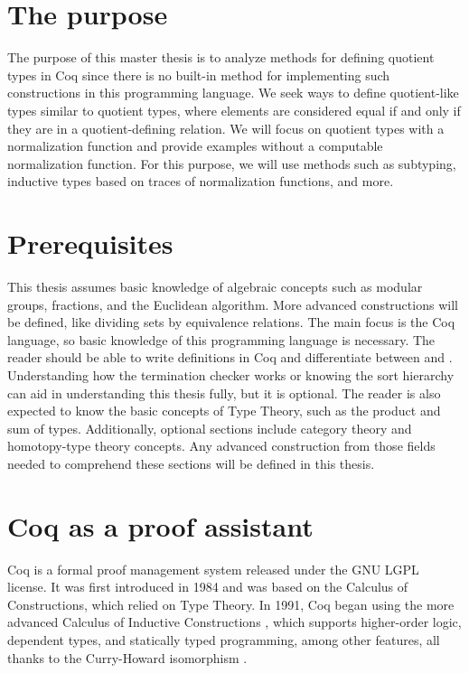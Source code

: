 \section{The purpose}
The purpose of this master thesis is to analyze methods for defining quotient types in Coq since there is no built-in method for implementing such constructions in this programming language. We seek ways to define quotient-like types similar to quotient types, where elements are considered equal if and only if they are in a quotient-defining relation. We will focus on quotient types with a normalization function and provide examples without a computable normalization function. For this purpose, we will use methods such as subtyping, inductive types based on traces of normalization functions, and more.

\section{Prerequisites}
This thesis assumes basic knowledge of algebraic concepts such as modular groups, fractions, and the Euclidean algorithm. More advanced constructions will be defined, like dividing sets by equivalence relations. The main focus is the Coq language, so basic knowledge of this programming language is necessary. The reader should be able to write definitions in Coq and differentiate between  and . Understanding how the termination checker works or knowing the sort hierarchy can aid in understanding this thesis fully, but it is optional. The reader is also expected to know the basic concepts of Type Theory, such as the product and sum of types. Additionally, optional sections include category theory and homotopy-type theory concepts. Any advanced construction from those fields needed to comprehend these sections will be defined in this thesis.

\section{Coq as a proof assistant}
Coq is a formal proof management system released under the GNU LGPL license. It was first introduced in 1984 and was based on the Calculus of Constructions, which relied on Type Theory. In 1991, Coq began using the more advanced Calculus of Inductive Constructions \cite{coqDoc} \cite{cicOrigins}, which supports higher-order logic, dependent types, and statically typed programming, among other features, all thanks to the Curry-Howard isomorphism \cite{curry-howard}.

